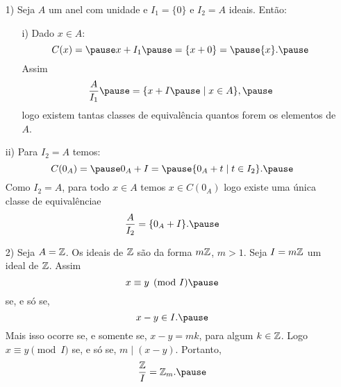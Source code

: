 \documentclass{beamer}
\begin{document}
    \begin{frame}
        \begin{exemplos}
            \begin{enumerate}
                \item[1)] Seja $A$ um anel com unidade \pause e $I_{1} = \{0\}$ \pause e $I_{2} = A$ ideais. \pause Ent\~ao:\pause
                \begin{enumerate}
                    \item[i)] Dado $x \in A$:\pause
                    \[
                        C(x) = \pause x + I_{1} \pause = \{x + 0\} = \pause \{x\}.\pause 
                    \]
                    Assim
                    \[
                        \dfrac{A}{I_{1}} \pause = \{x + I \pause \mid x \in A\},\pause
                    \]
                    logo existem tantas classes de equival{\^e}ncia \pause quantos forem os elementos de $A$.\pause
                \end{enumerate}
            \end{enumerate}
        \end{exemplos}
    \end{frame}

    \begin{frame}
        \begin{exemplos}
            \begin{enumerate}
                \item[ii)] Para $I_{2} = A$ \pause temos:
                \[
                    C(0_A) = \pause 0_A + I = \pause \{0_A + t \mid t \in I_{2}\}.\pause 
                \]
                Como $I_2 = A$, \pause para todo $x \in A$ \pause temos $x \in C(0_A)$ \pause logo existe uma \'unica \pause classe de equival\^encia\pause e
                \[
                    \dfrac{A}{I_{2}} = \{0_{A} + I\}.\pause
                \]
            \end{enumerate}
        \end{exemplos}
    \end{frame}

    \begin{frame}
        \begin{exemplos}
            \begin{enumerate}
                \item[2)] Seja $A = \mathbb{Z}$. \pause Os ideais de $\mathbb{Z}$ \pause s{\~a}o da forma $m\mathbb{Z}$, \pause $m > 1$. \pause Seja $I = m\mathbb{Z}$ \pause um ideal de $\mathbb{Z}$. \pause Assim\pause
                \[
                    x\equiv y \pmod I\pause 
                \]
                se, e s\'o se, 
                \[
                    x - y \in I.\pause
                \]
                Mais isso ocorre \pause se, e somente se, \pause $x - y = mk $, \pause para algum $k \in \mathbb{Z}$. \pause Logo $x\equiv y \pmod I$ \pause se, e s\'o se, \pause $m\mid (x - y)$. \pause  Portanto,
                \[
                    \dfrac{\z}{I} = \z_m.\pause
                \]
            \end{enumerate}
        \end{exemplos}
    \end{frame}
\end{document}

